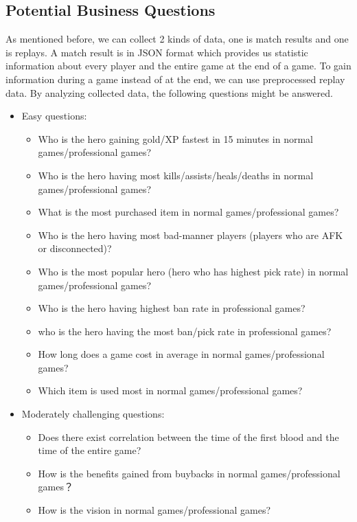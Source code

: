 \documentclass{article}
\begin{document}

\subsection{Potential Business Questions}

As mentioned before, we can collect 2 kinds of data, one is match results and one is replays. A match result is in JSON format which provides us statistic information about every player and the entire game at the end of a game. To gain information during a game instead of at the end, we can use preprocessed replay data. By analyzing collected data, the following questions might be answered.
\begin{itemize}
    \item Easy questions:
    \begin{itemize}
        \item Who is the hero gaining gold/XP fastest in 15 minutes in normal games/professional games?
        \item Who is the hero having most kills/assists/heals/deaths in normal games/professional games?
        \item What is the most purchased item in normal games/professional games?
        \item Who is the hero having most bad-manner players (players who are AFK or disconnected)?
        \item Who is the most popular hero (hero who has highest pick rate) in normal games/professional games?
        \item Who is the hero having highest ban rate in professional games?
        \item who is the hero having the most ban/pick rate in professional games?
        \item How long does a game cost in average in normal games/professional games?
        \item Which item is used most in normal games/professional games?
    \end{itemize}
    \item Moderately challenging questions:
    \begin{itemize}
        \item Does there exist correlation between the time of the first blood and the time of the entire game?
        \item How is the benefits gained from buybacks in normal games/professional games？
        \item How is the vision in normal games/professional games?

\end{itemize}
\end{itemize}
\end{document}

